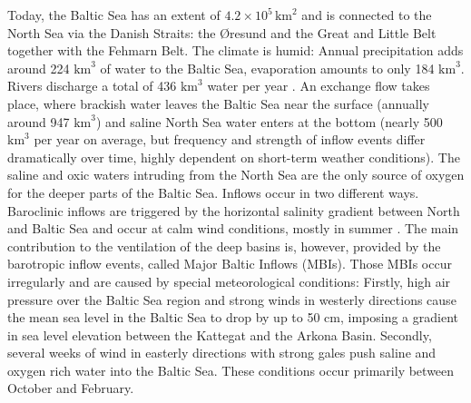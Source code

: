 Today, the Baltic Sea has an extent of $4.2 \times 10^{5} \, \text{km}^2$ 
\citep[][]{balticsea} and is connected to the North Sea via the Danish Straits: 
the \O resund and the Great and Little Belt together with the Fehmarn Belt. The 
climate is humid: Annual precipitation adds around 224 $\text{km}^3$ of water to 
the Baltic Sea, evaporation amounts to only 184 $\text{km}^3$. Rivers discharge 
a total of 436 $\text{km}^3$ water per year \citep[][]{reissmann2009}. An 
exchange flow takes place, where brackish water leaves the Baltic Sea near the 
surface (annually around 947 $\text{km}^3$) and saline North Sea water enters at 
the bottom (nearly 500 $\text{km}^3$ per year on average, but frequency and 
strength of inflow events differ dramatically over time, highly dependent on 
short-term weather conditions). The saline and oxic waters intruding from the 
North Sea are the only 
source of oxygen for the deeper parts of the Baltic Sea. Inflows occur in two 
different ways. Baroclinic inflows are triggered by the horizontal salinity 
gradient between North and Baltic Sea and occur at calm wind conditions, mostly 
in summer \citep[][]{reissmann2009}. The main contribution to the ventilation 
of the 
deep basins is, however, provided by the barotropic inflow events, called Major 
Baltic Inflows (MBIs). Those MBIs occur irregularly and are caused by special 
meteorological conditions: Firstly, high air pressure over the Baltic Sea 
region and strong winds in westerly directions cause the mean sea level in the 
Baltic Sea to drop by up to 50 cm, imposing a gradient in sea level elevation 
between the Kattegat and the Arkona Basin. Secondly, several weeks of wind in 
easterly 
directions with strong gales \citep[][]{balticsea, reissmann2009, mohrholz2015} 
push saline and oxygen rich water into the Baltic Sea. These conditions occur 
primarily between October and February. 

